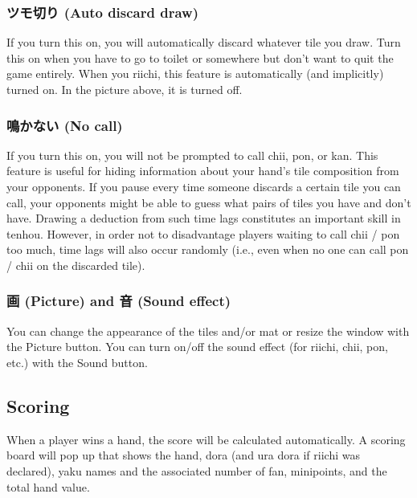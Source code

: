 \subsubsection{ツモ切り (Auto discard draw)} 
If you turn this on, you will automatically discard whatever tile you draw. Turn this on when you have to go to toilet or somewhere but don't want to quit the game entirely. When you {\jap riichi}, this feature is automatically (and implicitly) turned on. In the picture above, it is turned off. 

\subsubsection{鳴かない (No call)}
If you turn this on, you will not be prompted to call {\jap chii}, {\jap pon}, or {\jap kan}. This feature is useful for hiding information about your hand's tile composition from your opponents. If you pause every time someone discards a certain tile you can call, your opponents might be able to guess what pairs of tiles you have and don't have. Drawing a deduction from such time lags constitutes an important skill in {\jap tenhou}. However, in order not to disadvantage players waiting to call {\jap chii} / {\jap pon} too much, time lags will also occur randomly (i.e., even when no one can call {\jap pon} / {\jap chii} on the discarded tile). 

\subsubsection{画 (Picture) and 音 (Sound effect)}
You can change the appearance of the tiles and/or mat or resize the window with the Picture button. You can turn on/off the sound effect (for {\jap riichi}, {\jap chii}, {\jap pon}, etc.) with the Sound button.

\subsection{Scoring}
When a player wins a hand, the score will be calculated automatically. A scoring board will pop up that shows the hand, {\jap dora} (and {\jap ura dora} if {\jap riichi} was declared), {\jap yaku} names and the associated number of {\jap fan}, minipoints, and the total hand value. 

